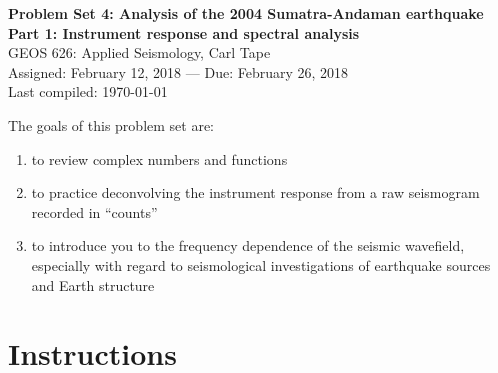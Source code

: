 \documentclass[11pt,titlepage,fleqn]{article}
\begin{document}

\begin{spacing}{1.2}
\centering
{\large \bf Problem Set 4: Analysis of the 2004 Sumatra-Andaman earthquake \\
Part 1: Instrument response and spectral analysis \\ }
GEOS 626: Applied Seismology, Carl Tape \\
Assigned: February 12, 2018 --- Due: February 26, 2018 \\
Last compiled: \today
\end{spacing}


\bigskip
\noindent
The goals of this problem set are:
%
\begin{enumerate}
\item to review complex numbers and functions
\item to practice deconvolving the instrument response from a raw seismogram recorded in ``counts''
\item to introduce you to the frequency dependence of the seismic wavefield, especially with regard to seismological investigations of earthquake sources and Earth structure
\end{enumerate}

\section*{Instructions}
\end{document}
